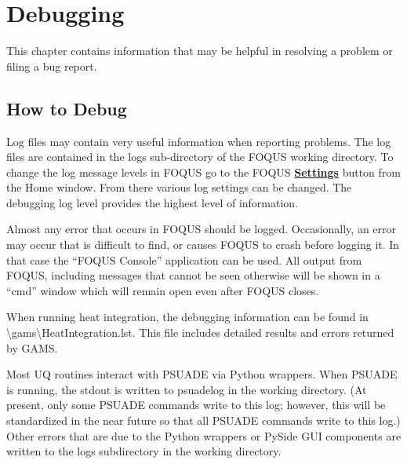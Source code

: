 \chapter{Debugging}

This chapter contains information that may be helpful in resolving a problem or filing a bug report.

\section{How to Debug}
Log files may contain very useful information when reporting problems. The log files are contained in the logs sub-directory of the FOQUS working directory. To change the log message levels in FOQUS go to the FOQUS \textbf{\underline{Settings}} button from the Home window. From there various log settings can be changed. The debugging log level provides the highest level of information.

Almost any error that occurs in FOQUS should be logged. Occasionally, an error may occur that is difficult to find, or causes FOQUS to crash before logging it. In that case the ``FOQUS Console'' application can be used.  All output from FOQUS, including messages that cannot be seen otherwise will be shown in a ``cmd'' window which will remain open even after FOQUS closes.

When running heat integration, the debugging information can be found in \\
\textbackslash gams\textbackslash HeatIntegration.lst. This file includes detailed results and errors returned by GAMS.

Most UQ routines interact with PSUADE via Python wrappers. When PSUADE is running, the stdout is written to psuadelog in the working directory. (At present, only some PSUADE commands write to this log; however, this will be standardized in the near future so that all PSUADE commands write to this log.) Other errors that are due to the Python wrappers or PySide GUI components are written to the logs subdirectory in the working directory.

